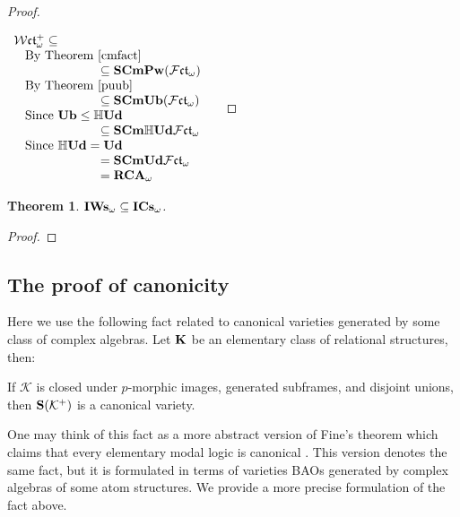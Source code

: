 \documentclass{article}
\theoremstyle{defin}
\theoremstyle{theorem}
\newtheorem{theorem}{Theorem}
\theoremstyle{claim}
\theoremstyle{prop}
\theoremstyle{lemma}
\theoremstyle{fact}
\theoremstyle{remark}
\theoremstyle{ex}
\theoremstyle{col}
\theoremstyle{question}
\begin{document}
\begin{proof}
$ $

$\begin{array}{lll}
\mathcal{W}\mathfrak{ct}_{\omega}^+ \subseteq & \\
\:\:\:\: \text{By Theorem~\ref{cmfact}} & \\
\:\:\:\:\:\:\:\:\:\:\:\:\:\:\:\:\:\:\:\:\:\:\:\:\:\:\:\:\:\:\: \subseteq {\bf S Cm Pw}(\mathcal{F}\mathfrak{ct}_{\omega}) & \\
\:\:\:\: \text{By Theorem~\ref{puub}} & \\
\:\:\:\:\:\:\:\:\:\:\:\:\:\:\:\:\:\:\:\:\:\:\:\:\:\:\:\:\:\:\: \subseteq {\bf S Cm Ub}(\mathcal{F}\mathfrak{ct}_{\omega}) & \\
\:\:\:\: \text{Since ${\bf Ub} \leq \mathbb{H}{\bf Ud}$} & \\
\:\:\:\:\:\:\:\:\:\:\:\:\:\:\:\:\:\:\:\:\:\:\:\:\:\:\:\:\:\:\: \subseteq {\bf S Cm} \mathbb{H}{\bf Ud}\mathcal{F}\mathfrak{ct}_{\omega} & \\
\:\:\:\: \text{Since $\mathbb{H}{\bf Ud} = {\bf Ud}$} & \\
\:\:\:\:\:\:\:\:\:\:\:\:\:\:\:\:\:\:\:\:\:\:\:\:\:\:\:\:\:\:\: = {\bf S Cm} {\bf Ud}\mathcal{F}\mathfrak{ct}_{\omega} & \\
\:\:\:\:\:\:\:\:\:\:\:\:\:\:\:\:\:\:\:\:\:\:\:\:\:\:\:\:\:\:\: = {\bf RCA}_{\omega}& \\
\end{array}$
\end{proof}

\begin{theorem}
${\bf IWs}_{\omega} \subseteq {\bf ICs}_{\omega}$.
\end{theorem}

\begin{proof}
    
\end{proof}

\subsection{The proof of canonicity}

Here we use the following fact related to canonical varieties generated by some class of complex algebras. Let ${\bf K}$ be an elementary class of relational structures, then:
\begin{center}
If $\mathcal{K}$ is closed under $p$-morphic images, generated subframes, and disjoint unions, then ${\bf S} (\mathcal{K}^+)$ is a canonical variety.
\end{center}
One may think of this fact as a more abstract version of Fine's theorem which claims that every elementary modal logic is canonical \cite{fine1975some}. This version denotes the same fact, but it is formulated in terms of varieties BAOs generated by complex algebras of some atom structures. We provide a more precise formulation of the fact above.
\end{document}
